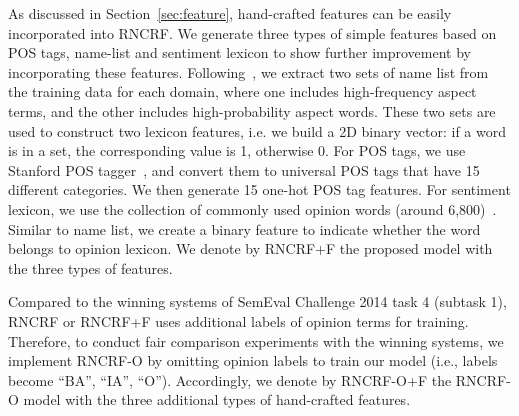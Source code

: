\documentclass[11pt,letterpaper]{article}
\begin{document}
As discussed in Section~\ref{sec:feature}, hand-crafted features can be easily incorporated into RNCRF. We generate three types of simple features based on POS tags, name-list and sentiment lexicon to show further improvement by incorporating these features. Following~\cite{toh14}, we extract two sets of name list from the training data for each domain, where one includes high-frequency aspect terms, and the other includes high-probability aspect words. These two sets are used to construct two lexicon features, i.e. we build a 2D binary vector: if a word is in a set, the corresponding value is 1, otherwise 0. For POS tags, we use Stanford POS tagger~\cite{Tout03}, and convert them to universal POS tags that have 15 different categories. We then generate 15 one-hot POS tag features. For sentiment lexicon, we use the collection of commonly used opinion words (around 6,800)~\cite{Hu04}. Similar to name list, we create a binary feature to indicate whether the word belongs to opinion lexicon. We denote by RNCRF+F the proposed model with the three types of features.

Compared to the winning systems of SemEval Challenge 2014 task 4 (subtask 1), RNCRF or RNCRF+F uses additional labels of opinion terms for training. Therefore, to conduct fair comparison experiments with the winning systems, we implement RNCRF-O by omitting opinion labels to train our model (i.e., labels become ``BA'', ``IA'', ``O''). Accordingly, we denote by RNCRF-O+F the RNCRF-O model with the three additional types of hand-crafted features.
\end{document}

